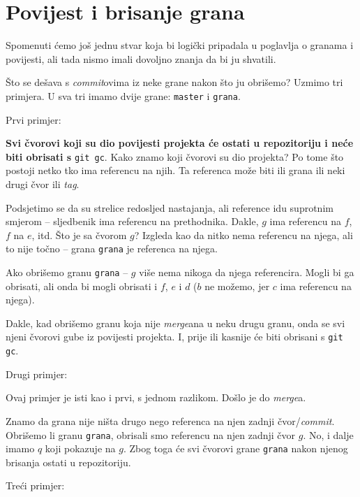\section*{Povijest i brisanje grana}

Spomenuti ćemo još jednu stvar koja bi logički pripadala u poglavlja o granama i povijesti, ali tada nismo imali dovoljno znanja da bi ju shvatili.

Što se dešava s \emph{commit}ovima iz neke grane nakon što ju obrišemo?
Uzmimo tri primjera.
U sva tri imamo dvije grane: \verb+master+ i \verb+grana+.

Prvi primjer:



\textbf{Svi čvorovi koji su dio povijesti projekta će ostati u repozitoriju i neće biti obrisati s} \verb+git gc+.
Kako znamo koji čvorovi su dio projekta?
Po tome što postoji netko tko ima referencu na njih.
Ta referenca može biti ili grana ili neki drugi čvor ili \emph{tag}.

Podsjetimo se da su strelice redosljed nastajanja, ali reference idu suprotnim smjerom -- sljedbenik ima referencu na prethodnika.
Dakle, $g$ ima referencu na $f$, $f$ na $e$, itd.
Što je sa čvorom $g$? 
Izgleda kao da nitko nema referencu na njega, ali to nije točno -- grana \verb+grana+ je referenca na njega.

Ako obrišemo granu \verb+grana+ -- $g$ više nema nikoga da njega referencira.
Mogli bi ga obrisati, ali onda bi mogli obrisati i $f$, $e$ i $d$ ($b$ ne možemo, jer $c$ ima referencu na njega).

Dakle, kad obrišemo granu koja nije \emph{merge}ana u neku drugu granu, onda se svi njeni čvorovi gube iz povijesti projekta.
I, prije ili kasnije će biti obrisani s \verb+git gc+.

Drugi primjer:



Ovaj primjer je isti kao i prvi, s jednom razlikom. 
Došlo je do \emph{merge}a.

Znamo da grana nije ništa drugo nego referenca na njen zadnji čvor/\emph{commit}.
Obrišemo li granu \verb+grana+, obrisali smo referencu na njen zadnji čvor $g$.
No, i dalje imamo $q$ koji pokazuje na $g$.
Zbog toga će svi čvorovi grane \verb+grana+ nakon njenog brisanja ostati u repozitoriju.

Treći primjer:

